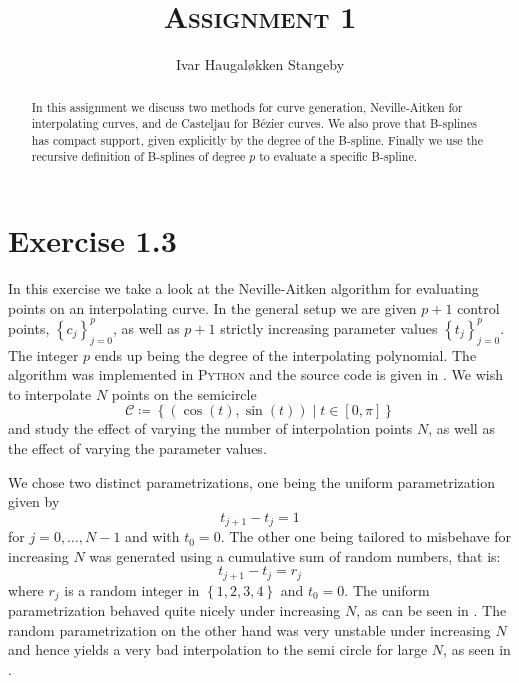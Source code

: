 \documentclass[12pt, article, oneside]{memoir}
\title{\textsc{Assignment 1}}
\author{Ivar Haugal{\o}kken Stangeby}
\begin{document}
    \maketitle    

    \begin{abstract}
       In this assignment we discuss two methods for curve generation,
       Neville-Aitken for interpolating curves, and de Casteljau for B\'ezier
       curves. We also prove that B-splines has compact support, given
       explicitly by the degree of the B-spline. Finally we use the recursive
       definition of B-splines of degree \(p\) to evaluate a specific B-spline.
    \end{abstract} 

    \chapter*{Exercise 1.3}
    \label{cha:exercise_1_3}
        
    In this exercise we take a look at the Neville-Aitken algorithm for
    evaluating points on an interpolating curve. In the general setup we are
    given \(p+1\) control points, \(\left\{ c_j \right\}_{j=0}^p\), as well as
    \(p+1\) strictly increasing parameter values \(\left\{ t_j
    \right\}_{j=0}^p\). The integer \(p\) ends up being the degree of the
    interpolating polynomial. The algorithm was implemented in \textsc{Python}
    and the source code is given in . We wish to interpolate
    \(N\) points on the semicircle 
    \begin{equation}
    \mathcal{C} \coloneqq \left\{ \left( \cos(t), \sin(t) \right) \mid t \in [0, \pi]\right\}
    \end{equation}
    and study the effect
    of varying the number of interpolation points \(N\), as well as the effect
    of varying the parameter values. 

    We chose two distinct parametrizations, one being the uniform
    parametrization given by
    \begin{equation}
        t_{j+1} - t_j = 1
    \end{equation}
    for \(j = 0, \ldots, N-1 \) and with \(t_0 = 0\). The other one being tailored
    to misbehave for increasing \(N\) was generated using a cumulative sum of
    random numbers, that is:
    \begin{equation}
        t_{j+1} - t_j = r_j
    \end{equation}
    where \(r_j\) is a random integer in \( \left\{ 1, 2, 3, 4\right\} \)  and
    \(t_0 = 0\). The uniform parametrization behaved quite nicely under
    increasing \(N\), as can be seen in . The random
    parametrization on the other hand was very unstable under increasing
    \(N\) and hence yields a very bad interpolation to the semi circle for
    large \(N\), as seen in .
\end{document}
